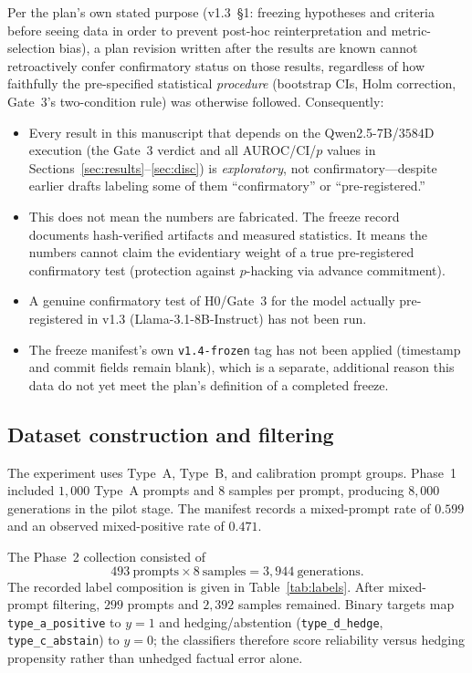\documentclass{article}
\begin{document}
Per the plan's own stated purpose (v1.3~\S1: freezing hypotheses and criteria before seeing data in order to prevent post-hoc reinterpretation and metric-selection bias), a plan revision written after the results are known cannot retroactively confer confirmatory status on those results, regardless of how faithfully the pre-specified statistical \emph{procedure} (bootstrap {CIs}, {Holm} correction, Gate~3's two-condition rule) was otherwise followed. Consequently:
\begin{itemize}[leftmargin=1.4em,itemsep=2pt]
\item Every result in this manuscript that depends on the {Qwen2.5-7B}/$3584${D} execution (the Gate~3 verdict and all {AUROC}/{CI}/$p$ values in Sections~\ref{sec:results}--\ref{sec:disc}) is \emph{exploratory}, not confirmatory---despite earlier drafts labeling some of them ``confirmatory'' or ``pre-registered.''
\item This does not mean the numbers are fabricated. The freeze record~\citep{exptrj001freeze} documents hash-verified artifacts and measured statistics. It means the numbers cannot claim the evidentiary weight of a true pre-registered confirmatory test (protection against $p$-hacking via advance commitment).
\item A genuine confirmatory test of {H0}/Gate~3 for the model actually pre-registered in v1.3 ({Llama-3.1-8B-Instruct}) has not been run.
\item The freeze manifest's own \texttt{v1.4-frozen} tag has not been applied (timestamp and commit fields remain blank), which is a separate, additional reason this data do not yet meet the plan's definition of a completed freeze.
\end{itemize}

\subsection{Dataset construction and filtering}
\label{sec:data}

The experiment uses Type~A, Type~B, and calibration prompt groups. Phase~1 included $1{,}000$ Type~A prompts and $8$ samples per prompt, producing $8{,}000$ generations in the pilot stage. The manifest records a mixed-prompt rate of $0.599$ and an observed mixed-positive rate of $0.471$.

The Phase~2 collection consisted of
\begin{equation}
  493\ \text{prompts}\times 8\ \text{samples}=3{,}944\ \text{generations}.
\end{equation}
The recorded label composition is given in Table~\ref{tab:labels}. After mixed-prompt filtering, $299$ prompts and $2{,}392$ samples remained. Binary targets map \texttt{type\_a\_positive} to $y=1$ and hedging/abstention (\texttt{type\_d\_hedge}, \texttt{type\_c\_abstain}) to $y=0$; the classifiers therefore score reliability versus hedging propensity rather than unhedged factual error alone.
\end{document}
